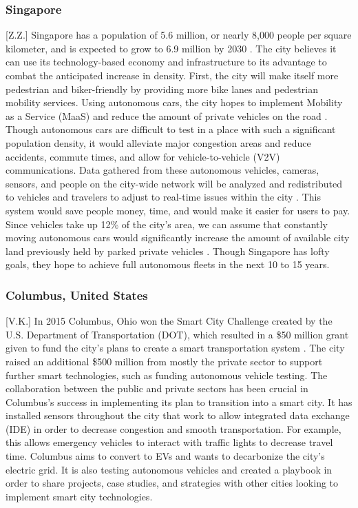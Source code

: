 \documentclass[12pt]{article}                       %
\begin{document}
\subsubsection{Singapore}[Z.Z.]
Singapore has a population of 5.6 million, or nearly 8,000 people per square kilometer, and is expected to grow to 6.9 million by 2030 \cite{2016SmartSingapore}. The city believes it can use its technology-based economy and infrastructure to its advantage to combat the anticipated increase in density. First, the city will make itself more pedestrian and biker-friendly by providing more bike lanes and pedestrian mobility services. Using autonomous cars, the city hopes to implement Mobility as a Service (MaaS) and reduce the amount of private vehicles on the road \cite{Huiling2017AISingapore}. Though autonomous cars are difficult to test in a place with such a significant population density, it would alleviate major congestion areas and reduce accidents, commute times, and allow for vehicle-to-vehicle (V2V) communications. Data gathered from these autonomous vehicles, cameras, sensors, and people on the city-wide network will be analyzed and redistributed to vehicles and travelers to adjust to real-time issues within the city \cite{2016SmartSingapore}. This system would save people money, time, and would make it easier for users to pay. Since vehicles take up 12\% of the city's area, we can assume that constantly moving autonomous cars would significantly increase the amount of available city land previously held by parked private vehicles \cite{Huiling2017AISingapore}. Though Singapore has lofty goals, they hope to achieve full autonomous fleets in the next 10 to 15 years.

\subsubsection{Columbus, United States}[V.K.]
In 2015 Columbus, Ohio won the Smart City Challenge created by the U.S. Department of Transportation (DOT), which resulted in a \$50 million grant given to fund the city's plans to create a smart transportation system \cite{2016ColumbusChallenge}. The city raised an additional \$500 million from mostly the private sector to support further smart technologies, such as funding autonomous vehicle testing. The collaboration between the public and private sectors has been crucial in Columbus's success in implementing its plan to transition into a smart city. It has installed sensors throughout the city that work to allow integrated data exchange (IDE) in order to decrease congestion and smooth transportation. For example, this allows emergency vehicles to interact with traffic lights to decrease travel time. Columbus aims to convert to EVs and wants to decarbonize the city's electric grid. It is also testing autonomous vehicles and created a playbook in order to share projects, case studies, and strategies with other cities looking to implement smart city technologies.
\end{document}
